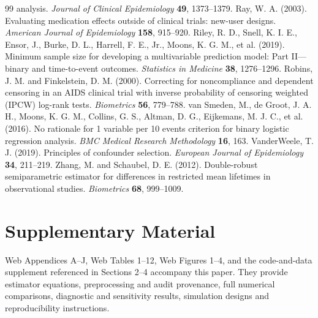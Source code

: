 \documentclass[12pt,letterpaper]{article}
\begin{document}
\begin{thebibliography}{99}
analysis. \textit{Journal of Clinical Epidemiology} \textbf{49}, 1373--1379.
 Ray, W. A. (2003). Evaluating medication effects outside of clinical trials:
new-user designs. \textit{American Journal of Epidemiology} \textbf{158}, 915--920.
 Riley, R. D., Snell, K. I. E., Ensor, J., Burke, D. L.,
Harrell, F. E., Jr., Moons, K. G. M., et al. (2019). Minimum sample size for developing a multivariable
prediction model: Part II---binary and time-to-event outcomes. \textit{Statistics in Medicine} \textbf{38}, 1276--1296.
 Robins, J. M. and Finkelstein, D. M. (2000).
Correcting for noncompliance and dependent censoring in an AIDS clinical trial with inverse probability
of censoring weighted (IPCW) log-rank tests. \textit{Biometrics} \textbf{56}, 779--788.
 van Smeden, M., de Groot, J. A. H., Moons, K. G. M.,
Collins, G. S., Altman, D. G., Eijkemans, M. J. C., et al. (2016).
No rationale for 1 variable per 10 events criterion for binary logistic regression analysis.
\textit{BMC Medical Research Methodology} \textbf{16}, 163.
 VanderWeele, T. J. (2019). Principles of confounder selection.
\textit{European Journal of Epidemiology} \textbf{34}, 211--219.
 Zhang, M. and Schaubel, D. E. (2012).
Double-robust semiparametric estimator for differences in restricted mean lifetimes in observational studies.
\textit{Biometrics} \textbf{68}, 999--1009.
\end{thebibliography}


\section*{Supplementary Material}
Web Appendices A--J, Web Tables 1--12, Web Figures 1--4, and the code-and-data supplement referenced in
Sections 2--4 accompany this paper. They provide estimator equations, preprocessing and audit provenance,
full numerical comparisons, diagnostic and sensitivity results, simulation designs and reproducibility instructions.
\end{document}
